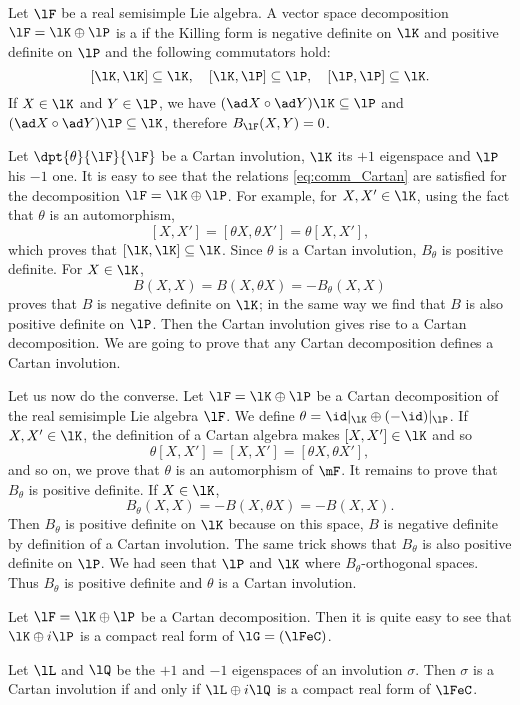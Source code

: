 Let $\lF$ be a real semisimple Lie algebra. A vector space decomposition $\lF=\lK\oplus\lP$ is a  if the Killing form is negative definite on $\lK$ and positive definite on $\lP$ and the following commutators hold:
\begin{equation}\label{eq:comm_Cartan}
	[\lK,\lK]\subseteq\lK,\quad[\lK,\lP]\subseteq\lP,\quad[\lP,\lP]\subseteq\lK.
\end{equation}
If $X\in\lK$ and $Y\in\lP$, we have $(\ad X\circ\ad Y)\lK\subseteq\lP$ and $(\ad X\circ\ad Y)\lP\subseteq\lK$, therefore $B_{\lF}(X,Y)=0$.

Let $\dpt{\theta}{\lF}{\lF}$ be a Cartan involution, $\lK$ its $+1$ eigenspace and $\lP$ his $-1$ one. It is easy to see that the relations \eqref{eq:comm_Cartan} are satisfied for the decomposition  $\lF=\lK\oplus\lP$. For example, for $X,X'\in\lK$, using the fact that $\theta$ is an automorphism,
\[
	[X,X']=[\theta X,\theta X']=\theta[X,X'],
\]
which proves that $[\lK,\lK]\subseteq\lK$. Since $\theta$ is a Cartan involution, $B_{\theta}$ is positive definite. For $X\in\lK$,
\[
	B(X,X)=B(X,\theta X)=-B_{\theta}(X,X)
\]
proves that $B$ is negative definite on $\lK$; in the same way we find that $B$ is also positive definite on $\lP$. Then the Cartan involution gives rise to a Cartan decomposition. We are going to prove that any Cartan decomposition defines a Cartan involution.

Let us now do the converse. Let $\lF=\lK\oplus\lP$ be a Cartan decomposition of the real semisimple Lie algebra $\lF$. We define $\theta=\id|_{\lK}\oplus(-\id)|_{\lP}$. If $X,X'\in\lK$, the definition of a Cartan algebra makes $[X,X']\in\lK$ and so
\[
	\theta[X,X']=[X,X']=[\theta X,\theta X'],
\]
and so on, we prove that $\theta$ is an automorphism of $\mF$. It remains to prove that $B_{\theta}$ is positive definite. If $X\in\lK$,
\[
	B_{\theta}(X,X)=-B(X,\theta X)=-B(X,X).
\]
Then $B_{\theta}$ is positive definite on $\lK$ because on this space, $B$ is negative definite by definition of a Cartan involution. The same trick shows that $B_{\theta}$ is also positive definite on $\lP$. We had seen that $\lP$ and $\lK$ where $B_{\theta}$-orthogonal spaces. Thus $B_{\theta}$ is positive definite and $\theta$ is a Cartan involution.

Let $\lF=\lK\oplus\lP$ be a Cartan decomposition. Then it is quite easy to see that $\lK\oplus i\lP$ is a compact real form of $\lG=(\lFeC)$.

\begin{proposition}
	Let $\lL$ and $\lQ$ be the $+1$ and $-1$ eigenspaces of an involution $\sigma$. Then $\sigma$ is a Cartan involution if and only if $\lL\oplus i\lQ$ is  a compact real form of $\lFeC$.
\end{proposition}

